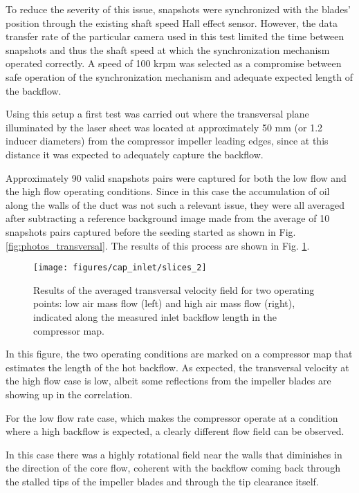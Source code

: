 To reduce the severity of this issue, snapshots were synchronized with the blades' position through the existing shaft speed Hall effect sensor. However, the data transfer rate of the particular camera used in this test limited the time between snapshots and thus the shaft speed at which the synchronization mechanism operated correctly. A speed of 100 krpm was selected as a compromise between safe operation of the synchronization mechanism and adequate expected length of the backflow.

Using this setup a first test was carried out where the transversal plane illuminated by the laser sheet was located at approximately 50 mm (or 1.2 inducer diameters) from the compressor impeller leading edges, since at this distance it was expected to adequately capture the backflow.

Approximately 90 valid snapshots pairs were captured for both the low flow and the high flow operating conditions. Since in this case the accumulation of oil along the walls of the duct was not such a relevant issue, they were all averaged after subtracting a reference background image made from the average of 10 snapshots pairs captured before the seeding started as shown in Fig. \ref{fig:photos_transversal}. The results of this process are shown in Fig. \ref{fig:slices_2}.

\begin{figure}[thb!]
\hspace{-0.06\textwidth}
\texttt{[image: figures/cap\_inlet/slices\_2]}
\caption{Results of the averaged transversal velocity field for two operating points: low air mass flow (left) and high air mass flow (right), indicated along the measured inlet backflow length in the compressor map.}
\label{fig:slices_2}
\end{figure}

In this figure, the two operating conditions are marked on a compressor map that estimates the length of the hot backflow. As expected, the transversal velocity at the high flow case is low, albeit some reflections from the impeller blades are showing up in the correlation.

For the low flow rate case, which makes the compressor operate at a condition where a high backflow is expected, a clearly different flow field can be observed.

In this case there was a highly rotational field near the walls that diminishes in the direction of the core flow, coherent with the backflow coming back through the stalled tips of the impeller blades and through the tip clearance itself.

